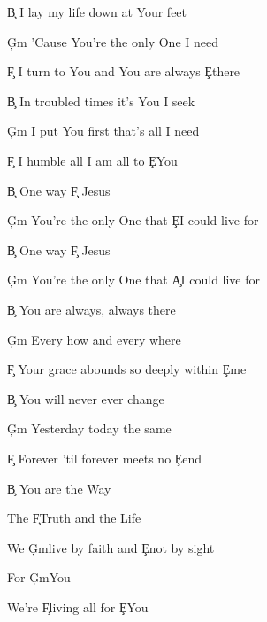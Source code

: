 \documentclass[9pt]{extarticle}
\begin{document}
\bsong

\bv
\c{B} I lay my life down at Your feet

\c{G\s m} 'Cause You're the only One I need

\c{F\s } I turn to You and You are always \c{E}there

\c{B} In troubled times it's You I seek

\c{G\s m} I put You first that's all I need

\c{F\s } I humble all I am all to \c{E}You
\ev

\bc
\c{B} One way \c{F\s } Jesus

\c{G\s m} You're the only One that \c{E}I could live for

\c{B} One way \c{F\s } Jesus

\c{G\s m} You're the only One that \c{A}I could live for
\ec

\bv
\c{B} You are always, always there

\c{G\s m} Every how and every where

\c{F\s } Your grace abounds so deeply within \c{E}me

\c{B} You will never ever change

\c{G\s m} Yesterday today the same

\c{F\s } Forever 'til forever meets no \c{E}end
\ev


\bb[4]
\c{B} You are the Way

The \c{F\s }Truth and the Life

We \c{G\s m}live by faith and \c{E}not by sight

For \c{G\s m}You

We're \c{F\s }living all for \c{E}You
\eb


\esong
\end{document}
